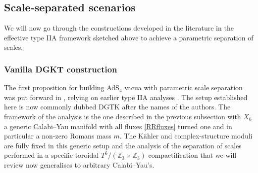 \documentclass[11pt, a4paper]{article}
\newcommand{\Z}{\mathbb{Z}}
\begin{document}
\subsection{Scale-separated scenarios}

We will now go through the constructions developed in the literature in the effective type IIA framework sketched above to achieve a parametric separation of scales.

\subsubsection{Vanilla DGKT construction}
\label{sec:vanilla}

The first proposition for building AdS$_4$ vacua with parametric scale separation was put forward in \cite{DeWolfe:2005uu}, relying on earlier type IIA analyses \cite{Villadoro:2005cu,Derendinger:2005ph,Behrndt:2004km,Behrndt:2004mj}. The setup established here is now commonly dubbed DGTK after the names of the authors. The framework of the analysis is the one described in the previous subsection with $X_6$ a generic Calabi--Yau manifold with all fluxes \eqref{RRfluxes} turned one and in particular a non-zero Romans mass $m$. The Kähler and complex-structure moduli are fully fixed in this generic setup and the analysis of the separation of scales performed in a specific toroidal $T^6/(\Z_3\times\Z_3)$ compactification that we will review now generalises to arbitrary Calabi--Yau's.
\end{document}
